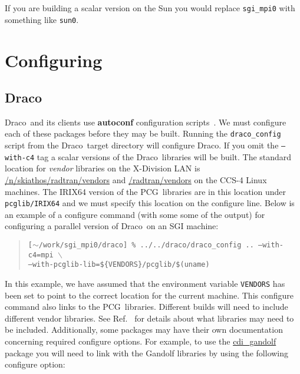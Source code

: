 \documentclass[10pt]{nmemo}
\newcommand{\comp}[1]{\normalfont\normalsize\texttt{#1}}
\newcommand{\draco}{{\normalfont\sffamily Draco}}
\newcommand{\pcg}{{\normalfont\sffamily PCG}}
\begin{document}
If you are building a scalar version on the Sun you would replace
\comp{sgi\_mpi0} with something like \comp{sun0}.


\section{Configuring}
\label{configure}

\subsection{\draco}

\draco\ and its clients use \textbf{autoconf} configuration
scripts~\cite{autoconf}.  We must configure each of these packages
before they may be built.  Running the \comp{draco\_config} script
from the \draco\ target directory will configure \draco.  If you omit
the \comp{--with-c4} tag a scalar versions of the \draco\ libraries
will be built.  The standard location for \emph{vendor} libraries on
the X-Division LAN is \url{/n/skiathos/radtran/vendors} and
\url{/radtran/vendors} on the CCS-4 Linux machines.  The IRIX64
version of the \pcg\ libraries are in this location under
\comp{pcglib/IRIX64} and we must specify this location on the
configure line.  Below is an example of a configure command (with some
some of the output) for configuring a parallel version of \draco\ on
an SGI machine:  

\footnotesize
\begin{verse}
\texttt{[$\sim$/work/sgi\_mpi0/draco] \% ../../draco/draco\_config .. --with-c4=mpi $\backslash$\\
\hspace{0.5in}--with-pcglib-lib=\$\{VENDORS\}/pcglib/\$(uname)} \\
\end{verse}
\normalsize

In this example, we have assumed that the environment variable
\comp{VENDORS} has been set to point to the correct location for the
current machine. This configure command also links to the \pcg\ 
libraries.  Different builds will need to include different vendor
libraries.  See Ref.~\cite{draco-build} for details about what
libraries may need to be included.  Additionally, some packages may
have their own documentation concerning required configure options.
For example, to use the \url{cdi_gandolf} package you will need to
link with the Gandolf libraries by using the following configure
option:
\end{document}
